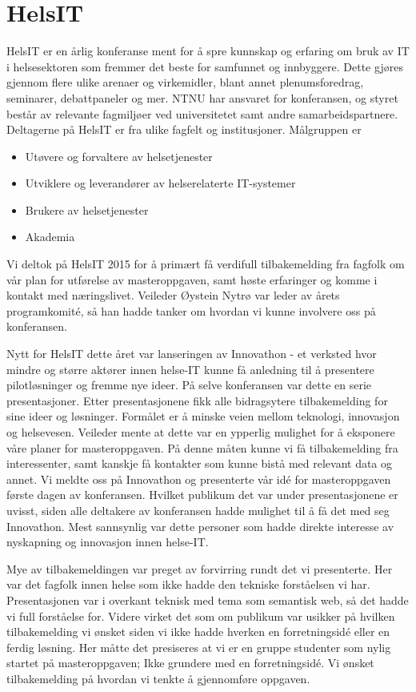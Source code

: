 \section{HelsIT}
HelsIT er en årlig konferanse ment for å spre kunnskap og erfaring om bruk av IT i helsesektoren som fremmer det beste for samfunnet og innbyggere. Dette gjøres gjennom flere ulike arenaer og virkemidler, blant annet plenumsforedrag, seminarer, debattpaneler og mer. NTNU har ansvaret for konferansen, og styret består av relevante fagmiljøer ved universitetet samt andre samarbeidspartnere.  Deltagerne på HelsIT er fra ulike fagfelt og institusjoner. Målgruppen er 
\begin{itemize}
\item Utøvere og forvaltere av helsetjenester
\item Utviklere og leverandører av helserelaterte IT-systemer
\item Brukere av helsetjenester 
\item Akademia
\end{itemize}

Vi deltok på HelsIT 2015 for å primært få verdifull tilbakemelding fra fagfolk om vår plan for utførelse av masteroppgaven, samt høste erfaringer og komme i kontakt med næringslivet. Veileder Øystein Nytrø var leder av årets programkomité, så han hadde tanker om hvordan vi kunne involvere oss på konferansen.

Nytt for HelsIT dette året var lanseringen av Innovathon - et verksted hvor mindre og større aktører innen helse-IT kunne få anledning til å presentere pilotløsninger og fremme nye ideer. På selve konferansen var dette en serie presentasjoner. Etter presentasjonene fikk alle bidragsytere tilbakemelding for sine ideer og løsninger. Formålet er å minske veien mellom teknologi, innovasjon og helsevesen. Veileder mente at dette var en ypperlig mulighet for å eksponere våre planer for masteroppgaven. På denne måten kunne vi få tilbakemelding fra interessenter, samt kanskje få kontakter som kunne bistå med relevant data og annet. Vi meldte oss på Innovathon og presenterte vår idé for masteroppgaven første dagen av konferansen. Hvilket publikum det var under presentasjonene er uvisst, siden alle deltakere av konferansen hadde mulighet til å få det med seg Innovathon. Mest sannsynlig var dette personer som hadde direkte interesse av nyskapning og innovasjon innen helse-IT.  

Mye av tilbakemeldingen var preget av forvirring rundt det vi presenterte. Her var det fagfolk innen helse som ikke hadde den tekniske forståelsen vi har. Presentasjonen var i overkant teknisk med tema som semantisk web, så det hadde vi full forståelse for. Videre virket det som om publikum var usikker på hvilken tilbakemelding vi ønsket siden vi ikke hadde hverken en forretningsidé eller en ferdig løsning. Her måtte det presiseres at vi er en gruppe studenter som nylig startet på masteroppgaven; Ikke grundere med en forretningsidé. Vi ønsket tilbakemelding på hvordan vi tenkte å gjennomføre oppgaven. 

